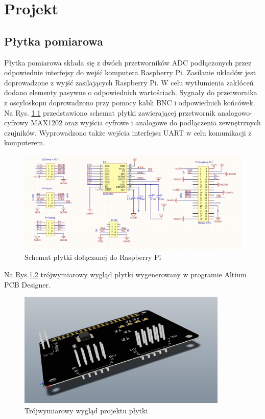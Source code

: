 \chapter{Projekt}
\label{ch:projekt}

\section{Płytka pomiarowa}

Płytka pomiarowa składa się z dwóch przetworników ADC podłączonych przez odpowiednie interfejsy do wejść komputera Raspberry Pi. Zasilanie układów jest doprowadzone z wyjść zasilających Raspberry Pi. W celu wytłumienia zakłóceń dodano elementy pasywne o odpowiednich wartościach. Sygnały do przetwornika z oscyloskopu doprowadzono przy pomocy kabli BNC i odpowiednich końcówek.
Na Rys. \ref{fig:schplytki} przedstawiono schemat płytki zawierającej przetwornik analogowo-cyfrowy MAX1202 oraz wyjścia cyfrowe i analogowe do podłączenia zewnętrznych czujników. Wyprowadzono także wejścia interfejsu UART w celu komunikacji z komputerem.


\begin{figure}[h]
	\centering
		\includegraphics[width=13cm]{schplytki}
	\caption{Schemat płytki dołączanej do Raspberry Pi} 
	\label{fig:schplytki}
\end{figure}
\newpage
Na Rys.\ref{fig:plytka3d} trójwymiarowy wygląd płytki wygenerowany w programie Altium PCB Designer. 

\begin{figure}[H]
	\centering
		\includegraphics[width=10cm]{plytka3d}
	\caption{Trójwymiarowy wygląd projektu płytki} 
	\label{fig:plytka3d}
\end{figure}

